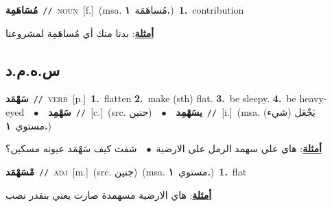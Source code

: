 \documentclass[10pt,a4paper,twoside]{article} %
\begin{document}
\begin{multicols}{2}
{\setlength\topsep{0pt}\textbf{\foreignlanguage{arabic}{مُسَاهَمِة}}\ {\color{gray}\texttt{//}\color{black}}\ \textsc{noun}\ [f.]\ \color{gray}(msa. \foreignlanguage{arabic}{مُساهَمَة}~\foreignlanguage{arabic}{\textbf{١.}})\color{black}\ \textbf{1.}~contribution\  \begin{flushright}\color{gray}\foreignlanguage{arabic}{\textbf{\underline{\foreignlanguage{arabic}{أمثلة}}}: بدنا منك أي مُساهَمِة لمشروعنا}\end{flushright}\color{black}} \vspace{2mm}

\vspace{-3mm}
\subsection*{\color{blue}\foreignlanguage{arabic}{س.ه.م.د}\color{blue}{}} 

{\setlength\topsep{0pt}\textbf{\foreignlanguage{arabic}{سَهْمَد}}\ {\color{gray}\texttt{//}\color{black}}\ \textsc{verb}\ [p.]\ \textbf{1.}~flatten  \textbf{2.}~make (sth) flat.  \textbf{3.}~be sleepy.  \textbf{4.}~be heavy-eyed\ \ $\bullet$\ \ \setlength\topsep{0pt}\textbf{\foreignlanguage{arabic}{سَهْمِد}}\ {\color{gray}\texttt{//}\color{black}}\ [c.]\ (src. \color{gray}\foreignlanguage{arabic}{جنين}\color{black})\ \ $\bullet$\ \ \setlength\topsep{0pt}\textbf{\foreignlanguage{arabic}{يسَهْمِد}}\ {\color{gray}\texttt{//}\color{black}}\ [i.]\ \color{gray}(msa. \foreignlanguage{arabic}{يَجْعَل (شيء) مستوي}~\foreignlanguage{arabic}{\textbf{١.}})\color{black}\  \begin{flushright}\color{gray}\foreignlanguage{arabic}{\textbf{\underline{\foreignlanguage{arabic}{أمثلة}}}: هاي علي سهمد الرمل على الارضية\ $\bullet$\ \  شفت كيف سَهْمَد عيونه مسكين؟}\end{flushright}\color{black}} \vspace{2mm}

{\setlength\topsep{0pt}\textbf{\foreignlanguage{arabic}{مْسَهْمَد}}\ {\color{gray}\texttt{//}\color{black}}\ \textsc{adj}\ [m.]\ (src. \color{gray}\foreignlanguage{arabic}{جنين}\color{black})\ \color{gray}(msa. \foreignlanguage{arabic}{مستوي}~\foreignlanguage{arabic}{\textbf{١.}})\color{black}\ \textbf{1.}~flat\  \begin{flushright}\color{gray}\foreignlanguage{arabic}{\textbf{\underline{\foreignlanguage{arabic}{أمثلة}}}: هاي الارضية مسهمدة صارت يعني بنقدر نصب}\end{flushright}\color{black}} \vspace{2mm}


\end{multicols}
\end{document}
